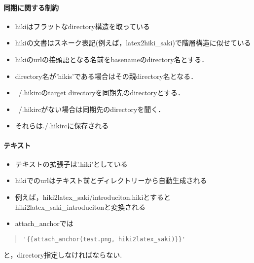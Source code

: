 \paragraph{同期に関する制約}
\begin{itemize}
\item hikiはフラットなdirectory構造を取っている
\item hikiの文書はスネーク表記(例えば，latex2hiki\_saki)で階層構造に似せている
\item hikiのurlの接頭語となる名前をbasenameのdirectory名とする．
\item directory名が'hikis'である場合はその親directory名となる．
\item ~/.hikircのtarget directoryを同期先のdirectoryとする．
\item ~/.hikircがない場合は同期先のdirectoryを聞く．
\item それらは./.hikircに保存される
\end{itemize}
\paragraph{テキスト}
\begin{itemize}
\item テキストの拡張子は'.hiki'としている
\item hikiでのurlはテキスト前とディレクトリーから自動生成される
\item 例えば，hiki2latex\_saki/introduciton.hikiとするとhiki2latex\_saki\_introducitonと変換される
\item attach\_anchorでは
\end{itemize}\begin{quote}\begin{verbatim}
'{{attach_anchor(test.png, hiki2latex_saki)}}'
\end{verbatim}\end{quote}
と，directory指定しなければならない.